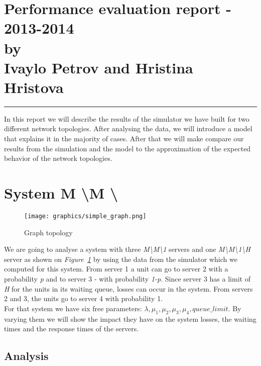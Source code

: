 \documentclass[12pt]{article}
\newcommand{\hr}{\rule{\linewidth}{0.1mm}}
\theoremstyle{plain}
\begin{document}
\section*{\centering
  Performance evaluation report - 2013-2014 \\
  by\\
  Ivaylo Petrov and Hristina Hristova 
}

\hr

In this report we will describe the results of the simulator we have built for
two different network topologies. After analysing the data, we will introduce a
model that explains it in the majority of cases. After that we will make compare
our results from the simulation and the model to the approximation of the expected
behavior of the network topologies.

\section*{\textbf{System M \textbackslash M \textbackslash *}}

\begin{figure}[h]
  \caption{Graph topology}
  \texttt{[image: graphics/simple\_graph.png]}\\
  \label{fig:simple_graph}
\end{figure}

We are going to analyse a system with three \emph{M\textbackslash M\textbackslash 1}
servers and one \emph{M\textbackslash M\textbackslash 1\textbackslash H} server
as shown on \emph{Figure~\ref{fig:simple_graph}} by using the data from the simulator which we computed
for this system. From server 1 a unit can go to server 2 with a probability
\emph{p} and to server 3 - with probability \emph{1-p}. Since server 3 has a
limit of \emph{H} for the units in its waiting queue, losses can occur in the
system. From servers 2 and 3, the units go to server 4 with probability 1.\\
For that system we have six free parameters: $\lambda, \mu_1, \mu_2, \mu_3, \mu_4,
queue\_limit$. By varying them we will show the impact they have on the system
losses, the waiting times and the response times of the servers.

\subsection*{Analysis}
\end{document}
